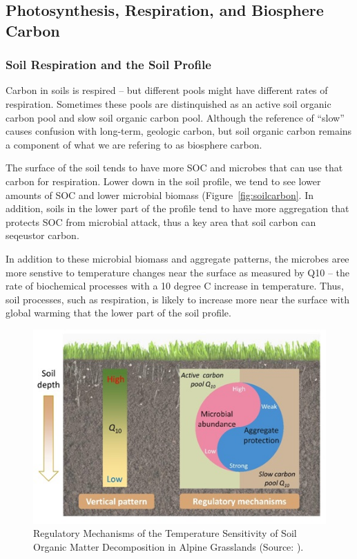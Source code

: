 \documentclass{book}\usepackage{knitr}
\begin{document}
\subsection{Photosynthesis, Respiration, and Biosphere Carbon}

\subsubsection{Soil Respiration and the Soil Profile}

Carbon in soils is respired -- but different pools might have different rates of respiration. Sometimes these pools are distinquished as an active soil organic carbon pool and slow soil organic carbon pool. Although the reference of ``slow'' causes confusion with long-term, geologic carbon, but soil organic carbon remains a component of what we are refering to as biosphere carbon. 

The surface of the soil tends to have more SOC and microbes that can use that carbon for respiration. Lower down in the soil profile, we tend to see lower amounts of SOC and lower microbial biomass (Figure~\ref{fig:soilcarbon}. In addition, soils in the lower part of the profile tend to have more aggregation that protects SOC from microbial attack, thus a key area that soil carbon can seqeustor carbon. 

In addition to these microbial biomass and aggregate patterns, the microbes aree more senstive to temperature changes near the surface as measured by Q10 -- the rate of biochemical processes with a 10 degree C increase in temperature. Thus, soil processes, such as respiration, is likely to increase more near the surface with global warming that the lower part of the soil profile.  

\begin{figure}
\includegraphics[width=\linewidth]{images/earth-system/Q10-SOC-Regulation.jpg}
\caption{Regulatory Mechanisms of the Temperature Sensitivity of Soil Organic Matter Decomposition in Alpine Grasslands (Source: \citet{Qineaau1218, CAS2021researchers}).}
\label{fig:Q10-SOC}
\end{figure}
\end{document}
